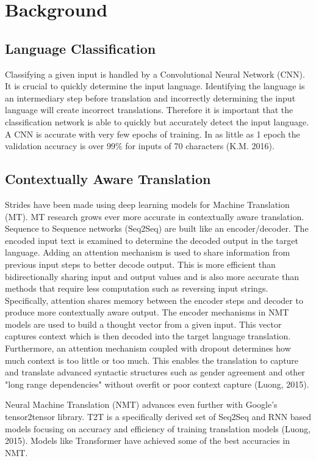 \documentclass[10pt,a4paper]{article}
\begin{document}
\section{Background}


\subsection{Language Classification}


Classifying a given input is handled by a Convolutional Neural Network (CNN). It is crucial to quickly determine the input language. Identifying the language is an intermediary step before translation and incorrectly determining the input language will create incorrect translations. Therefore it is important that the classification network is able to quickly but accurately detect the input language. A CNN is accurate with very few epochs of training. In as little as 1 epoch the validation accuracy is over 99\% for inputs of 70 characters (K.M. 2016).


\subsection{Contextually Aware Translation}


Strides have been made using deep learning models for Machine Translation (MT).  MT research grows ever more accurate in contextually aware translation. Sequence to Sequence networks (Seq2Seq) are built like an encoder/decoder. The encoded input text is examined to determine the decoded output in the target language. Adding an attention mechanism is used to share information from previous input steps to better decode output. This is more efficient than bidirectionally sharing input and output values and is also more accurate than methods that require less computation such as reversing input strings. Specifically, attention shares memory between the encoder steps and decoder to produce more contextually aware output. The encoder mechanisms in NMT models are used to build a thought vector from a given input. This vector captures context which is then decoded into the target language translation. Furthermore, an attention mechanism coupled with dropout determines how much context is too little or too much. This enables the translation to capture and translate advanced syntactic structures such as gender agreement and other "long range dependencies" without overfit or poor context capture (Luong, 2015).


Neural Machine Translation (NMT) advances even further with Google's tensor2tensor library. T2T is a specifically derived set of Seq2Seq and RNN based models focusing on accuracy and efficiency of training translation models (Luong, 2015). Models like Transformer have achieved some of the best accuracies in NMT.
  
\end{document}
